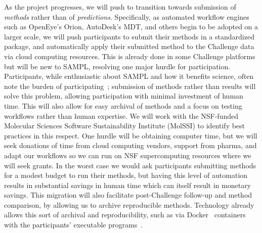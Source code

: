 \documentclass[11pt]{article}
\begin{document}
As the project progresses, we will push to transition towards submission of \emph{methods} rather than of \emph{predictions}. 
Specifically, as automated workflow engines such as OpenEye's Orion, AutoDesk's MDT, and others begin to be adopted on a larger scale, we will push participants to submit their methods in a standardized package, and automatically apply their submitted method to the Challenge data via cloud computing resources.
This is already done in some Challenge platforms~\cite{Saez-Rodriguez:2016:NatRevGenet} but will be new to SAMPL, resolving one major hurdle for participation. 
Participants, while enthusiastic about SAMPL and how it benefits science, often note the burden of participating~\cite{Mobley:2017:eScholarship}; submission of methods rather than results will solve this problem, allowing participation with minimal investment of human time.
This will also allow for easy archival of methods and a focus on testing workflows rather than human expertise.
We will work with the NSF-funded Molecular Sciences Software Sustainability Institute (MolSSI) to identify best practices in this respect. 
One hurdle will be obtaining computer time, but we will seek donations of time from cloud computing vendors, support from pharma, and adapt our workflows so we can run on NSF supercomputing resources where we will seek grants. 
In the worst case we would ask participants submitting methods for a modest budget to run their methods, but having this level of automation results in substantial savings in human time which can itself result in monetary savings. 
This migration will also facilitate post-Challenge follow-up and method comparison, by allowing us to archive reproducible methods.
Technology already allows this sort of archival and reproducibility, such as via Docker~\cite{docker_what_2015} containers with the participants' executable programs~\cite{Saez-Rodriguez:2016:NatRevGenet}.
\end{document}
